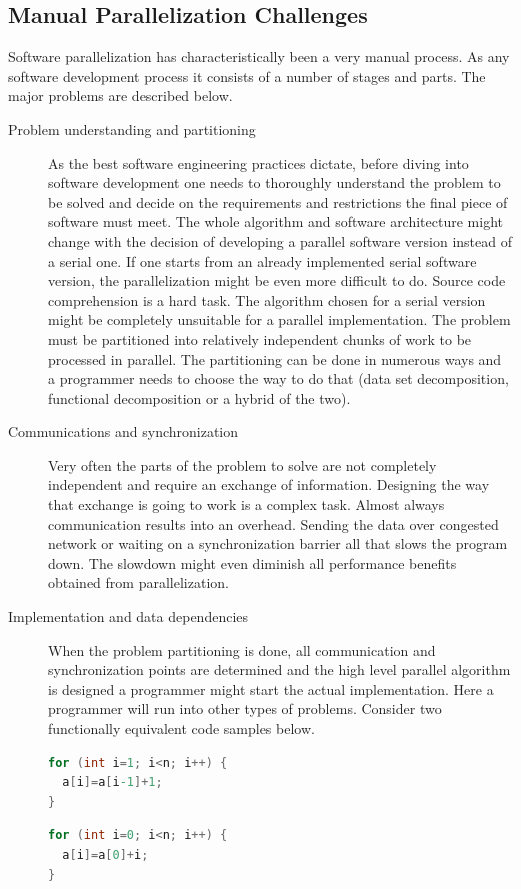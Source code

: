 \subsection{Manual Parallelization Challenges}
\label{background_challenges_manual}
\quad Software parallelization has characteristically been a very manual process. As any software development process it consists of a number of stages and parts. The major problems are described below.
\begin{description}
\item[Problem understanding and partitioning] As the best software engineering practices dictate, before diving into software development one needs to thoroughly understand the problem to be solved and decide on the requirements and restrictions the final piece of software must meet. The whole algorithm and software architecture might change with the decision of developing a parallel software version instead of a serial one. If one starts from an already implemented serial software version, the parallelization might be even more difficult to do. Source code comprehension is a hard task. The algorithm chosen for a serial version might be completely unsuitable for a parallel implementation. The problem must be partitioned into relatively independent chunks of work to be processed in parallel. The partitioning can be done in numerous ways and a programmer needs to choose the way to do that (data set decomposition, functional decomposition or a hybrid of the two).
\item[Communications and synchronization] Very often the parts of the problem to solve are not completely independent and require an exchange of information. Designing the way that exchange is going to work is a complex task. Almost always communication results into an overhead. Sending the data over congested network or waiting on a synchronization barrier all that slows the program down. The slowdown might even diminish all performance benefits obtained from parallelization.
\item[Implementation and data dependencies] When the problem partitioning is done, all communication and synchronization points are determined and the high level parallel algorithm is designed a programmer might start the actual implementation. Here a programmer will run into other types of problems. Consider two functionally equivalent code samples below.\newline\null
\begin{minipage}[t]{0.50\linewidth}
\begin{lstlisting}[caption={Non-parallelizable loop with planted loop-carried data dependence.},label={lst:code_sample_data_dependence},language=C]
for (int i=1; i<n; i++) {
  a[i]=a[i-1]+1;
}
\end{lstlisting}
\end{minipage}
\begin{minipage}[t]{0.50\linewidth}
\begin{lstlisting}[caption={Parallelizable loop free of any data dependencies.}, label={lst:code_sample_no_data_dependence},language=C]
for (int i=0; i<n; i++) {
  a[i]=a[0]+i;
}
\end{lstlisting}
\end{minipage}


\end{description}
